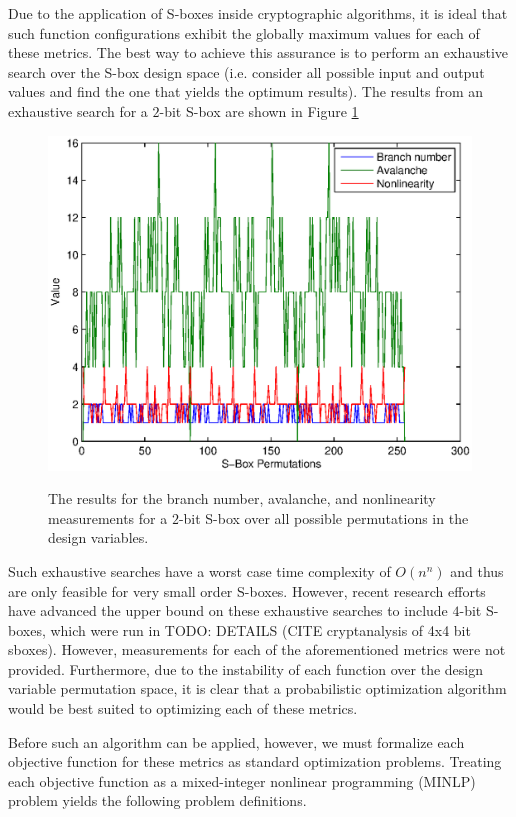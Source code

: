 \documentclass[11pt]{article}
\begin{document}
Due to the application of S-boxes inside cryptographic algorithms, it is ideal that such function configurations exhibit the globally maximum values for each of these metrics. The best way to achieve this assurance is to perform an exhaustive search over the S-box design space (i.e. consider all possible input and output values and find the one that yields the optimum results). The results from an exhaustive search for a $2$-bit S-box are shown in Figure \ref{bfjoint}

\begin{figure}
	\centering
	\includegraphics[scale=0.75]{images/brute_joint.eps} \\
	\label{bfjoint}
\caption{The results for the branch number, avalanche, and nonlinearity measurements for a $2$-bit S-box over all possible permutations in the design variables.}
\end{figure}

Such exhaustive searches have a worst case time complexity of $O(n^n)$ and thus are only feasible for very small order S-boxes. However, recent research efforts have advanced the upper bound on these exhaustive searches to include $4$-bit S-boxes, which were run in TODO: DETAILS (CITE cryptanalysis of 4x4 bit sboxes). However, measurements for each of the aforementioned metrics were not provided. Furthermore, due to the instability of each function over the design variable permutation space, it is clear that a probabilistic optimization algorithm would be best suited to optimizing each of these metrics. 

Before such an algorithm can be applied, however, we must formalize each objective function for these metrics as standard optimization problems. Treating each objective function as a mixed-integer nonlinear programming (MINLP) problem yields the following problem definitions. \\
\end{document}
